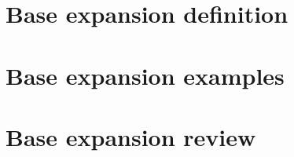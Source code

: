 
\section*{Base expansion definition}

\vfill
\section*{Base expansion examples}

\vfill
\section*{Base expansion review}

\vfill

